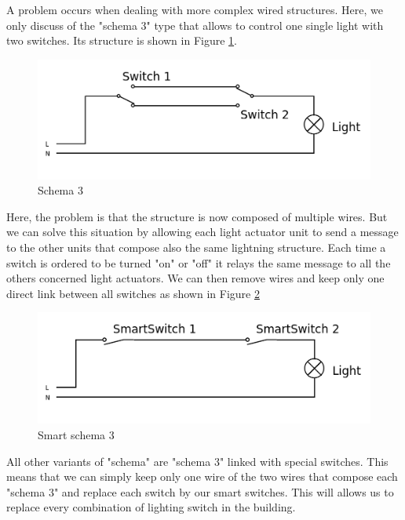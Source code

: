 \documentclass{acm_proc_article-sp}
\begin{document}
A problem occurs when dealing with more complex wired structures. Here, we only discuss of the "schema 3" type that allows to control one single light
with two switches. Its structure is shown in Figure \ref{schema3}.
				\begin{figure}[htb]
  				\begin{center}
    				\includegraphics[width=\linewidth]{schema3}
    				\caption{Schema 3 \label{schema3}}
  				\end{center}
				\end{figure}
Here, the problem is that the structure is now composed of multiple wires.
But we can solve this situation by allowing each light actuator unit to send a message to the other units that compose also the same lightning structure.
Each time a switch is ordered to be turned "on" or "off" it relays the same message to all the others concerned light actuators.
We can then remove wires and keep only one direct link between all switches as shown in Figure \ref{new_schema3}
				\begin{figure}[htb]
  				\begin{center}
    				\includegraphics[width=\linewidth]{new_schema3}
    				\caption{Smart schema 3 \label{new_schema3}}
  				\end{center}
				\end{figure}
All other variants of "schema" are "schema 3" linked with special switches. This means that we can simply keep only one wire of the two wires that compose each "schema 3" and replace each switch by our smart switches.
This will allows us to replace every combination of lighting switch in the building.
\end{document}
